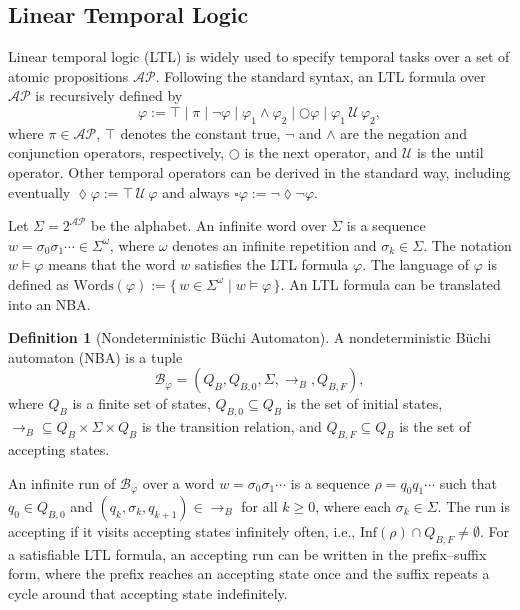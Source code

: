 \documentclass[lettersize,journal]{IEEEtran}
\theoremstyle{italiclemma}
\theoremstyle{italiclemma}
\theoremstyle{definition}
\newtheorem{definition}{Definition}
\begin{document}
\subsection{Linear Temporal Logic}

Linear temporal logic (LTL) \cite{baier2008principles} is widely used to specify temporal tasks over a set of atomic propositions $\mathcal{AP}$. Following the standard syntax, an LTL formula over $\mathcal{AP}$ is recursively defined by
\[
\varphi := \top \mid \pi \mid \neg \varphi \mid \varphi_1 \wedge \varphi_2 \mid \bigcirc \varphi \mid \varphi_1 \,\mathcal{U}\, \varphi_2,
\]
where $\pi \in \mathcal{AP}$, $\top$ denotes the constant true, $\neg$ and $\wedge$ are the negation and conjunction operators, respectively, $\bigcirc$ is the next operator, and $\mathcal{U}$ is the until operator. Other temporal operators can be derived in the standard way, including eventually $\lozenge \varphi := \top \,\mathcal{U}\, \varphi$ and always $\square \varphi := \neg \lozenge \neg \varphi$.

Let $\Sigma = 2^{\mathcal{AP}}$ be the alphabet. An infinite word over $\Sigma$ is a sequence $w=\sigma_0\sigma_1\cdots \in \Sigma^\omega$, where $\omega$ denotes an infinite repetition and  $\sigma_k \in \Sigma$. The notation $w \models \varphi$ means that the word $w$ satisfies the LTL formula $\varphi$.  The language of $\varphi$ is defined as $\mathrm{Words}(\varphi) := \{\, w \in \Sigma^\omega \mid w \models \varphi \,\}.$
An LTL formula can be translated into an NBA.
\begin{definition}[Nondeterministic Büchi Automaton]
A nondeterministic Büchi automaton (NBA) is a tuple
$$
\mathcal{B}_{\varphi}=(Q_B,Q_{B,0},\Sigma,\rightarrow_B,Q_{B,F}),
$$
where $Q_B$ is a finite set of states, $Q_{B,0} \subseteq Q_B$ is the set of initial states, $\rightarrow_B \subseteq Q_B \times \Sigma \times Q_B$ is the transition relation, and $Q_{B,F} \subseteq Q_B$ is the set of accepting states.
\end{definition}
An infinite run of $\mathcal{B}_\varphi$ over a word $w=\sigma_0\sigma_1\cdots$ is a sequence $\rho=q_0q_1\cdots$ such that $q_0 \in Q_{B,0}$ and $(q_k,\sigma_k,q_{k+1}) \in \rightarrow_B$ for all $k \ge 0$, where each $\sigma_k \in \Sigma$. The run is accepting if it visits accepting states infinitely often, i.e., $\mathrm{Inf}(\rho)\cap Q_{B,F} \neq \emptyset$. For a satisfiable LTL formula, an accepting run can be written in the prefix--suffix form, where the prefix reaches an accepting state once and the suffix repeats a cycle around that accepting state indefinitely.
\end{document}
